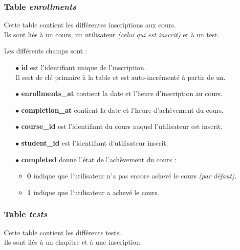 \subsubsection{Table \textit{enrollments}}
\label{sec:table-enrollments}
Cette table contient les différentes inscriptions aux cours.\\
Ils sont liés à un cours, un utilisateur \textit{(celui qui est inscrit)} et à un test.

Les différents champs sont :

\begin{itemize}
    
    \item[$\bullet$] \textbf{id} est l'identifiant unique de l'inscription.\\
    Il sert de clé primaire à la table et est auto-incrémenté à partir de un.
    
    \item[$\bullet$] \textbf{enrollments\_at} contient la date et l'heure d'inscription au cours.
    
    \item[$\bullet$] \textbf{completion\_at} contient la date et l'heure d'achèvement du cours.
    
    \item[$\bullet$] \textbf{course\_id} est l'identifiant du cours auquel l'utilisateur est inscrit.
    
    \item[$\bullet$] \textbf{student\_id} est l'identifiant d'utilisateur inscrit.
    
    \item[$\bullet$] \textbf{completed} donne l'état de l'achèvement du cours :
    
    \begin{itemize}
        
        \item \textbf{0} indique que l'utilisateur n'a pas encore achevé le cours \textit{(par défaut)}.
        
        \item \textbf{1} indique que l'utilisateur a achevé le cours.
        
    \end{itemize}
    
\end{itemize}

\newpage

\subsubsection{Table \textit{tests}}
\label{sec:table-tests}
Cette table contient les différents tests.\\
Ils sont liés à un chapitre et à une inscription.

